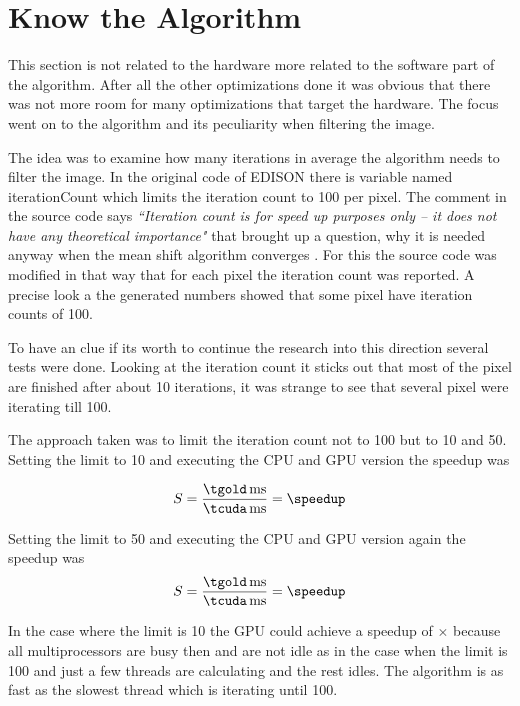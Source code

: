 \section{Know the Algorithm} %
\label{sec:know_the_algo}
This section is not related to the hardware more related to the software part of 
the algorithm. After all the other optimizations done it was obvious that there
was not more room for many optimizations that target the hardware. The focus went
on to the algorithm and its peculiarity when filtering the image. 

The idea was to examine how many iterations in average the algorithm needs to
filter the image. In the original code of \gls{EDISON} there is variable named
\textsf{iterationCount} which limits the iteration count to 100 per pixel. The
comment in the source code says \textit{``Iteration count is for speed up
purposes only -- it does not have any theoretical importance"} that brought up a
question, why it is needed anyway when the mean shift algorithm converges
\citep{citeulike:462300}. For this the source code was modified in that way
that for each pixel the iteration count was reported. A precise look a the 
generated numbers showed that some pixel have iteration counts of 100. 

To have an clue if its worth to continue the research into this direction several
tests were done. Looking at the iteration count it sticks out that most of the 
pixel are finished after about 10 iterations, it was strange to see that several
pixel were iterating till 100. 

The approach taken was to limit the iteration count not to 100 but to 10 and 50.
Setting the limit to 10 and executing the \gls{CPU} and \gls{GPU} version the
speedup was 
 
\fpDiv{\speedup}{\tgold}{\tcuda}
\begin{equation*}\label{eq:speedup7}
		S = \frac{\unit[\tgold]{ms}}{\unit[\tcuda]{ms}} = \speedup
\end{equation*}

Setting the limit to 50 and executing the \gls{CPU} and \gls{GPU} version again
the speedup was
\fpDiv{\speedup}{\tgold}{\tcuda}
\begin{equation*}\label{eq:speedup8}
	S = \frac{\unit[\tgold]{ms}}{\unit[\tcuda]{ms}} = \speedup
\end{equation*}

In the case where the limit is 10 the \gls{GPU} could achieve a speedup of 
\fpDiv{\speedup}{\tgold}{\tcuda} \speedup$\times$ because all multiprocessors
are busy then and are not idle as in the case when the limit is 100 and just a few
threads are calculating and the rest idles. The algorithm is as fast as the slowest
thread which is iterating until 100. 


